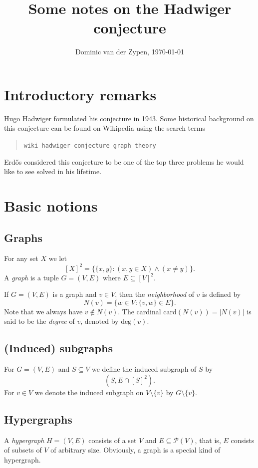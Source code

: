 \documentclass[12pt, a4paper]{amsart}
\begin{document}
\title{Some notes on the Hadwiger conjecture}
\author{Dominic van der Zypen, \today}
\maketitle
\section{Introductory remarks}
Hugo Hadwiger formulated his conjecture in 1943. 
Some historical background on this conjecture can be
found on Wikipedia using the search terms 
\begin{quote}{\tt wiki hadwiger conjecture graph theory}
\end{quote}
Erd\H{o}s considered this conjecture to be one of the 
top three problems he would like to see solved in his 
lifetime.
\section{Basic notions}
\subsection{Graphs} For any set $X$ we let $$[X]^2 = \big\{\{x,y\}: (x, y\in X)
\land (x\neq y)\big\}.$$ A {\em graph} is a tuple $G =(V,E)$
where $E \subseteq [V]^2$. 

If $G=(V,E)$ is a graph and $v\in V$, then the {\em neighborhood}
of $v$ is defined by $$N(v) = \{w\in V:\{v,w\}\in E\}.$$ Note
that we always have $v\notin N(v)$. The cardinal 
$\text{card}(N(v)) = |N(v)|$ is said to be the {\em degree} of $v$,
denoted by $\text{deg}(v)$.

\subsection{(Induced) subgraphs} For $G=(V,E)$ and $S\subseteq V$
we define the induced subgraph of $S$ by $$(S, E\cap [S]^2).$$
For $v\in V$ we denote the induced subgraph on $V\setminus\{v\}$ by
$G\setminus\{v\}$.


\subsection{Hypergraphs} A {\em hypergraph} $H=(V,E)$ consists of a
set $V$ and $E\subseteq {\mathcal P}(V)$, that is, $E$ 
consists of subsets of $V$ of arbitrary size. Obviously,
a graph is a special kind of hypergraph.
\end{document}
